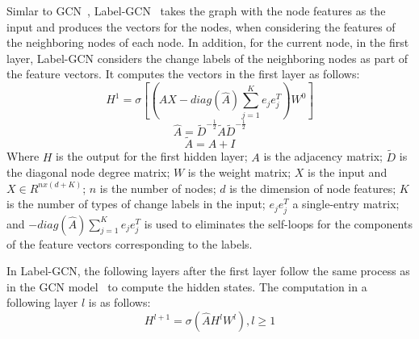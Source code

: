 Simlar to GCN~\cite{gcn}, Label-GCN~\cite{label-gcn} takes the graph
with the node features as the input and produces the vectors for the
nodes, when considering the features of the neighboring nodes of each
node.  In addition, for the current node, in the first layer,
Label-GCN considers the change labels of the neighboring nodes as part
of the feature vectors.
It computes the vectors in the first layer as follows:
\begin{equation}\label{eq1}
	H^1 = \sigma [(\hat{A}X-diag(\hat{A})\sum_{j=1}^{K}e_je^T_j)W^0]
\end{equation}
\begin{equation}\label{eq2}
	\hat{A} = \tilde{D}^{-\frac{1}{2}}\tilde{A}\tilde{D}^{-\frac{1}{2}}
\end{equation}
\begin{equation}\label{eq3}
	\tilde{A} = A + I
\end{equation}
Where $H$ is the output for the first hidden layer; $A$ is the
adjacency matrix; $\tilde{D}$ is the diagonal node degree matrix; $W$
is the weight matrix; $X$ is the input and $X \in R^{nx(d+K)}$; $n$ is
the number of nodes; $d$ is the dimension of node features; $K$ is the
number of types of change labels in the input; $e_je^T_j$ a single-entry
matrix; and $-diag(\hat{A})\sum_{j=1}^{K}e_je^T_j$ is used to
eliminates the self-loops for the components of the feature vectors
corresponding to the labels.


In Label-GCN, the following layers after the first layer follow the
same process as in the GCN model~\cite{gcn} to compute the hidden
states. The computation in a following layer $l$ is as follows:
\begin{equation}\label{eq4}
	H^{l+1} = \sigma (\hat{A}H^lW^l), l \geq 1 
\end{equation}

